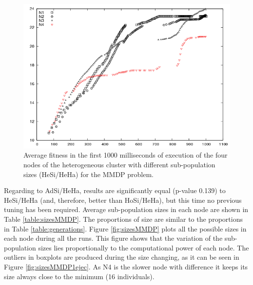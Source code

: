 \begin{figure}
\centering
 \includegraphics[scale =0.4] {gfx/adaptiveresults/generationsMMDPheterosize.png}
\caption{Average fitness in the first 1000 milliseconds of execution of the four nodes of the heterogeneous cluster with different sub-population sizes (HeSi/HeHa) for the MMDP problem.}
\label{fig:hesiheha}
\end{figure}

Regarding to AdSi/HeHa, results are significantly  equal (p-value 0.139) to HeSi/HeHa (and, therefore, better than HoSi/HeHa), but this time no previous tuning has been required.  Average sub-population sizes in each node are shown in Table \ref{table:sizesMMDP}. The proportions of size are similar to the proportions in Table \ref{table:generations}. Figure \ref{fig:sizesMMDP} plots all the possible sizes in each node during all the runs. This figure shows that the variation of the sub-population sizes lies proportionally to the computational power of each node. The outliers in boxplots are produced during the size changing, as it can be seen in Figure \ref{fig:sizesMMDP1ejec}. As N4 is the slower node with difference it keeps its size always close to the minimum (16 individuals).

